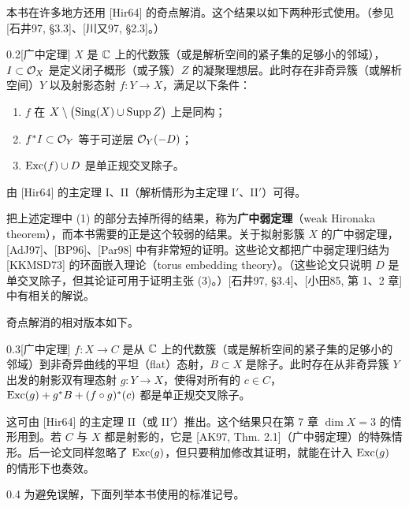 本书在许多地方还用 [Hir64] 的奇点解消。这个结果以如下两种形式使用。（参见 [石井97, §3.3]、[川又97, §2.3]。）

\begin{theorem*}{0.2}[广中定理]
$X$ 是 $\mathbb{C}$ 上的代数簇（或是解析空间的紧子集的足够小的邻域），$I\subset\mathcal{O}_X$ 是定义闭子概形（或子簇）$Z$ 的凝聚理想层。此时存在非奇异簇（或解析空间）$Y$ 以及射影态射 $f\colon Y\to X$，满足以下条件：
\begin{enumerate}[label=(\arabic*),leftmargin=2.4em,itemsep=1pt,topsep=2pt]
\item $f$ 在 $X\setminus\bigl(\operatorname{Sing}(X)\cup\operatorname{Supp} Z\bigr)$ 上是同构；
\item $f^*I\subset\mathcal{O}_Y$ 等于可逆层 $\mathcal{O}_Y(-D)$；
\item $\operatorname{Exc}(f)\cup D$ 是单正规交叉除子。
\end{enumerate}
\end{theorem*}

由 [Hir64] 的主定理 I、II（解析情形为主定理 I$'$、II$'$）可得。

把上述定理中 (1) 的部分去掉所得的结果，称为\textbf{广中弱定理}（weak Hironaka theorem），而本书需要的正是这个较弱的结果。关于拟射影簇 $X$ 的广中弱定理，[AdJ97]、[BP96]、[Par98] 中有非常短的证明。这些论文都把广中弱定理归结为 [KKMSD73] 的环面嵌入理论（torus embedding theory）。（这些论文只说明 $D$ 是单交叉除子，但其论证可用于证明主张 (3)。）[石井97, §3.4]、[小田85, 第 1、2 章] 中有相关的解说。

奇点解消的相对版本如下。

\begin{theorem*}{0.3}[广中定理]
$f\colon X\to C$ 是从 $\mathbb{C}$ 上的代数簇（或是解析空间的紧子集的足够小的邻域）到非奇异曲线的平坦（flat）态射，$B\subset X$ 是除子。此时存在从非奇异簇 $Y$ 出发的射影双有理态射 $g\colon Y\to X$，使得对所有的 $c\in C$，$\operatorname{Exc}(g)+g^*B+(f\circ g)^*(c)$ 都是单正规交叉除子。
\end{theorem*}

这可由 [Hir64] 的主定理 II（或 II$'$）推出。这个结果只在第 7 章 $\dim X=3$ 的情形用到。若 $C$ 与 $X$ 都是射影的，它是 [AK97, Thm. 2.1]（广中弱定理）的特殊情形。后一论文同样忽略了 $\operatorname{Exc}(g)$，但只要稍加修改其证明，就能在计入 $\operatorname{Exc}(g)$ 的情形下也奏效。

\begin{notation}{0.4}
为避免误解，下面列举本书使用的标准记号。
\end{notation}

